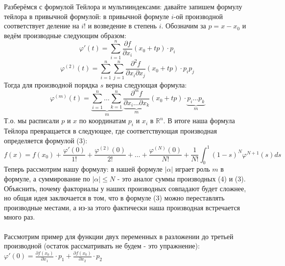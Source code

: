 \documentclass[book, 11pt]{report}
\begin{document}
        \par{Разберёмся с формулой Тейлора и мультииндексами: давайте запишем формулу тейлора в привычной формулой: в привычной формуле $i$-ой производной соответствует деление на $i!$ и возведение в степень $i$.
        \newpage
        Обозначим за $p=x-x_0$ и ведём производные следующим образом:
        \begin{equation*}
            \varphi'(t)=\sum_{i=1}^n\frac{\partial f}{\partial x_i}(x_0+tp)\cdot p_i
        \end{equation*}
        \begin{equation*}
            \varphi^{(2)}(t)=\sum_{i=1}^n\sum_{j=1}^n\frac{\partial^2 f}{\partial x_i\partial x_j}(x_0+tp)\cdot p_ip_j
        \end{equation*}
        Тогда для производной порядка $s$ верна следующая формула:
        \begin{equation}
            \varphi^{(m)}(t)=\underbrace{\sum_{i=1}^n\ldots\sum_{k=1}^n}_{m}\frac{\partial^m f}{\underbrace{\partial x_i\ldots\partial x_k}_{m}}(x_0+tp)\cdot \underbrace{p_i\ldots p_k}_{m}
        \end{equation}
        Т.о. мы расписали $p$ и $x$ по координатам $p_i$ и $x_i$ в $\mathbb{R}^n$. В итоге наша формула Тейлора превращается в следующее, где соответствующая производная определяется формулой (3):
        \begin{equation}
            f(x)=f(x_0)+\frac{\varphi'(0)}{1!}+\frac{\varphi^{(2)}(0)}{2!}+\ldots+\frac{\varphi^{(N)}(0)}{N!}+\frac{1}{N!}\int_{0}^{1}(1-s)^N\varphi^{N+1}(s)ds
        \end{equation}
        Теперь рассмотрим нашу формулу: в нашей формуле $|\alpha|$ играет роль $m$ в формуле, а суммирование по $|\alpha|\leq N$ - это аналог суммы производных (4) и (3). Объяснить, почему факториалы у наших производных совпадают будет сложнее, но общая идея заключается в том, что в формуле (3) можно переставлять производные местами, а из-за этого фактически наша производная встречается много раз. \\
        \\
        Рассмотрим пример для функции двух переменных в разложении до третьей производной (остаток рассматривать не будем - это упражнение):\\
        $\displaystyle \varphi'(0)=\frac{\partial f(x_0)}{\partial x_1}\cdot p_1+\frac{\partial f(x_0)}{\partial x_2}\cdot p_2$ \\
        \\ \\
}
\end{document}
